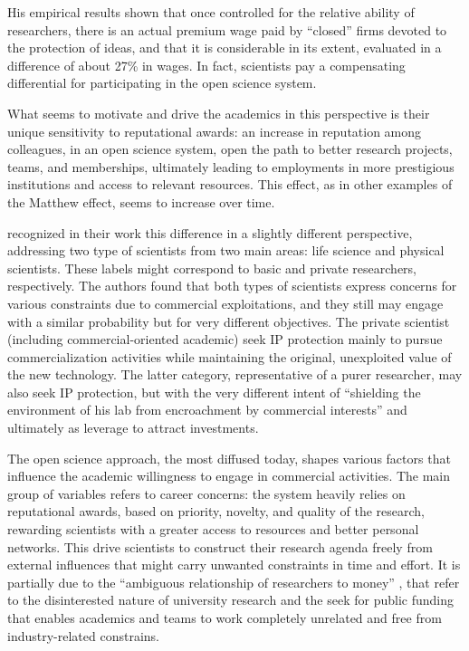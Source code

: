 His empirical results shown that once controlled for the relative ability of researchers, there is an actual premium wage paid by \enquote{closed} firms devoted to the protection of ideas, and that it is considerable in its extent, evaluated in a difference of about 27\% in wages. In fact, scientists pay a compensating differential for participating in the open science system. 

What seems to motivate and drive the academics in this perspective is their unique sensitivity to reputational awards: an increase in reputation among colleagues, in an open science system, open the path to better research projects, teams, and memberships, ultimately leading to employments in more prestigious institutions and access to relevant resources. This effect, as in other examples of the Matthew effect, seems to increase over time.

\citet{OwenSmith2001} recognized in their work this difference in a slightly different perspective, addressing two type of scientists from two main areas: life science and physical scientists. These labels might correspond to basic and private researchers, respectively. The authors found that both types of scientists express concerns for various constraints due to commercial exploitations, and they still may engage with a similar probability but for very different objectives. The private scientist (including commercial-oriented academic) seek IP protection mainly to pursue commercialization activities while maintaining the original, unexploited value of the new technology. The latter category, representative of a purer researcher, may also seek IP protection, but with the very different intent of \enquote{shielding the environment of his lab from encroachment by commercial interests} and ultimately as leverage to attract investments.

The open science approach, the most diffused today, shapes various factors that influence the academic willingness to engage in commercial activities. The main group of variables refers to career concerns: the system heavily relies on reputational awards, based on priority, novelty, and quality of the research, rewarding scientists with a greater access to resources and better personal networks. This drive scientists to construct their research agenda freely from external influences that might carry unwanted constraints in time and effort. It is partially due to the \enquote{ambiguous relationship of researchers to money} \citep{OShea2004}, that refer to the disinterested nature of university research and the seek for public funding that enables academics and teams to work completely unrelated and free from industry-related constrains. 

